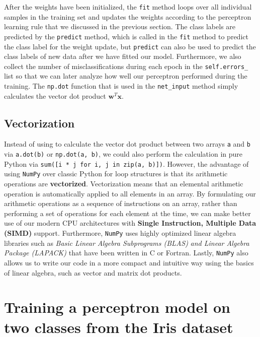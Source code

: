 \documentclass[11pt]{article}
\newcommand{\vect}[1]{\boldsymbol{#1}}
\begin{document}
    After the weights have been initialized, the \texttt{fit} method loops over all individual samples in the training set and updates the weights according to the perceptron learning rule that we discussed in the previous section.
    The class labels are predicted by the \texttt{predict} method, which is called in the \texttt{fit} method to predict the class label for the weight update, but \texttt{predict} can also be used to predict the class labels of new data after we have fitted our model.
    Furthermore, we also collect the number of misclassifications during each epoch in the \texttt{self.errors\_} list so that we can later analyze how well our perceptron performed during the training.
    The \texttt{np.dot} function that is used in the \texttt{net\_input} method simply calculates the vector dot product $\vect{w}^T \vect{x}$.

    \subsection{Vectorization} \label{subsec:vectorization}

    Instead of using  to calculate the vector dot product between two arrays \texttt{a} and \texttt{b} via \texttt{a.dot(b)} or \texttt{np.dot(a, b)}, we could also perform the calculation in pure Python via \texttt{sum([i * j for i, j in zip(a, b)])}.
    However, the advantage of using \texttt{NumPy} over classic Python for loop structures is that its arithmetic operations are \textbf{vectorized}.
    Vectorization means that an elemental arithmetic operation is automatically applied to all elements in an array.
    By formulating our arithmetic operations as a sequence of instructions on an array, rather than performing a set of operations for each element at the time, we can make better use of our modern CPU architectures with \textbf{Single Instruction, Multiple Data (SIMD)} support.
    Furthermore, \texttt{NumPy} uses highly optimized linear algebra libraries such as \textit{Basic Linear Algebra Subprograms (BLAS)} \textit{and Linear Algebra Package (LAPACK)} that have been written in C or Fortran.
    Lastly, \texttt{NumPy} also allows us to write our code in a more compact and intuitive way using the basics of linear algebra, such as vector and matrix dot products.

    \section{Training a perceptron model on two classes from the Iris dataset} \label{sec:perc_iris}
\end{document}
